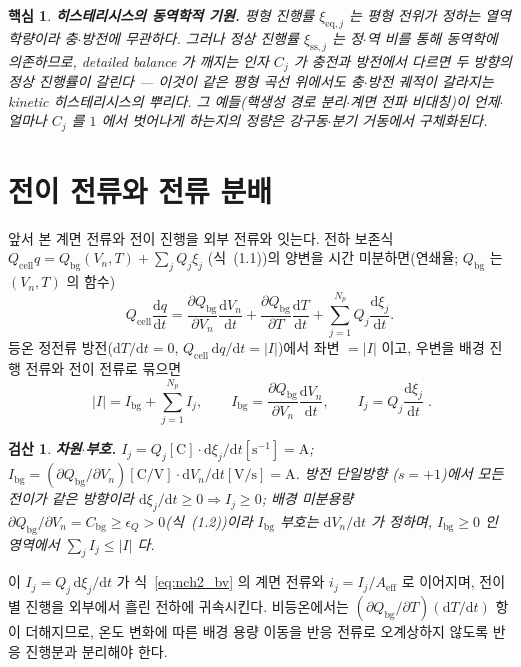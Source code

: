 \documentclass[11pt,a4paper]{article}
\newtheorem*{keybox}{핵심}
\newtheorem*{verifybox}{검산}
\newcommand{\dd}{\mathrm{d}}
\newcommand{\eff}{\mathrm{eff}}
\newcommand{\eq}{\mathrm{eq}}
\newcommand{\cell}{\mathrm{cell}}
\newcommand{\bg}{\mathrm{bg}}
\newcommand{\sstat}{\mathrm{ss}}
\begin{document}
\begin{keybox}
\textbf{히스테리시스의 동역학적 기원.} 평형 진행률 $\xi_{\eq,j}$ 는 평형 전위가 정하는 열역학량이라 충$\cdot$방전에
무관하다. 그러나 정상 진행률 $\xi_{\sstat,j}$ 는 정$\cdot$역 비를 통해 \emph{동역학}에 의존하므로, detailed balance
가 깨지는 인자 $C_j$ 가 충전과 방전에서 다르면 두 방향의 정상 진행률이 갈린다 — 이것이 같은 평형 곡선 위에서도
충$\cdot$방전 궤적이 갈라지는 \emph{kinetic 히스테리시스}의 뿌리다. 그 예들(핵생성 경로 분리$\cdot$계면 전파 비대칭)이 언제$\cdot$얼마나 $C_j$ 를 $1$ 에서 벗어나게 하는지의
\emph{정량}은 강구동$\cdot$분기 거동에서 구체화된다.
\end{keybox}

\section{전이 전류와 전류 분배}\label{sec:nch2_current}
앞서 본 계면 전류와 전이 진행을 외부 전류와 잇는다. 전하 보존식 $Q_\cell q=Q_\bg(V_n,T)+\sum_j Q_j\xi_j$
(식~(1.1))의 양변을 시간 미분하면(연쇄율; $Q_\bg$ 는 $(V_n,T)$ 의 함수)
\begin{equation}
Q_\cell\frac{\dd q}{\dd t}=\frac{\partial Q_\bg}{\partial V_n}\frac{\dd V_n}{\dd t}
+\frac{\partial Q_\bg}{\partial T}\frac{\dd T}{\dd t}+\sum_{j=1}^{N_p} Q_j\frac{\dd\xi_j}{\dd t}.
\label{eq:nch2_balance_dt}
\end{equation}
등온 정전류 방전($\dd T/\dd t=0$, $Q_\cell\,\dd q/\dd t=|I|$)에서 좌변 $=|I|$ 이고, 우변을 배경 진행 전류와 전이
전류로 묶으면
\begin{equation}
\boxed{\;|I|=I_\bg+\sum_{j=1}^{N_p}I_j,\qquad I_\bg=\frac{\partial Q_\bg}{\partial V_n}\frac{\dd V_n}{\dd t},\qquad
I_j=Q_j\frac{\dd\xi_j}{\dd t}\;.}
\label{eq:nch2_current}
\end{equation}
\begin{verifybox}
\textbf{차원$\cdot$부호.} $I_j=Q_j[\mathrm C]\cdot\dd\xi_j/\dd t[\mathrm{s^{-1}}]=\mathrm A$;
$I_\bg=(\partial Q_\bg/\partial V_n)[\mathrm{C/V}]\cdot\dd V_n/\dd t[\mathrm{V/s}]=\mathrm A$. 방전 단일방향
($s=+1$)에서 모든 전이가 같은 방향이라 $\dd\xi_j/\dd t\ge0\Rightarrow I_j\ge0$; 배경 미분용량
$\partial Q_\bg/\partial V_n=C_\bg\ge\epsilon_Q>0$(식~(1.2))이라 $I_\bg$ 부호는 $\dd V_n/\dd t$ 가 정하며,
$I_\bg\ge0$ 인 영역에서 $\sum_j I_j\le|I|$ 다.
\end{verifybox}
이 $I_j=Q_j\,\dd\xi_j/\dd t$ 가 식~\eqref{eq:nch2_bv} 의 계면 전류와 $i_j=I_j/A_\eff$ 로 이어지며, 전이별
진행을 외부에서 흘린 전하에 귀속시킨다. 비등온에서는 $(\partial Q_\bg/\partial T)(\dd T/\dd t)$ 항이 더해지므로,
온도 변화에 따른 배경 용량 이동을 반응 전류로 오계상하지 않도록 반응 진행분과 분리해야 한다.
\end{document}
